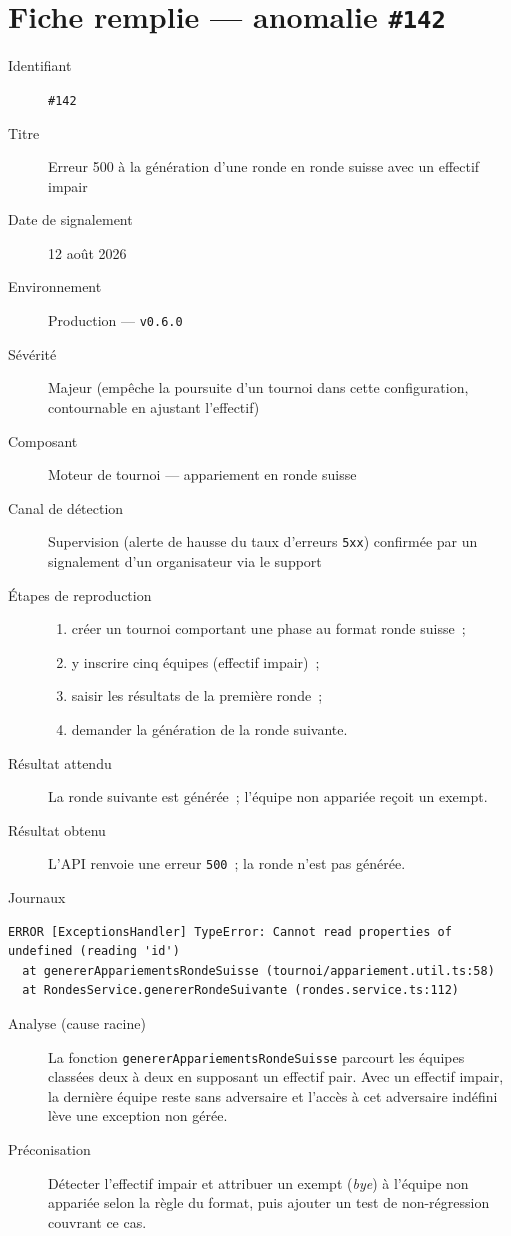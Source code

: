 \section*{Fiche remplie --- anomalie \texttt{\#142}}
\begin{description}
    \item[Identifiant] \texttt{\#142}
    \item[Titre] Erreur 500 à la génération d'une ronde en ronde suisse avec un effectif impair
    \item[Date de signalement] 12 août 2026
    \item[Environnement] Production --- \texttt{v0.6.0}
    \item[Sévérité] Majeur (empêche la poursuite d'un tournoi dans cette configuration, contournable en ajustant l'effectif)
    \item[Composant] Moteur de tournoi --- appariement en ronde suisse
    \item[Canal de détection] Supervision (alerte de hausse du taux d'erreurs \texttt{5xx}) confirmée par un signalement d'un organisateur via le support
    \item[Étapes de reproduction] \hfill
        \begin{enumerate}
            \item créer un tournoi comportant une phase au format ronde suisse~;
            \item y inscrire cinq équipes (effectif impair)~;
            \item saisir les résultats de la première ronde~;
            \item demander la génération de la ronde suivante.
        \end{enumerate}
    \item[Résultat attendu] La ronde suivante est générée~; l'équipe non appariée reçoit un exempt.
    \item[Résultat obtenu] L'API renvoie une erreur \texttt{500}~; la ronde n'est pas générée.
    \item[Journaux] \hfill
\end{description}

\begin{lstlisting}
ERROR [ExceptionsHandler] TypeError: Cannot read properties of
undefined (reading 'id')
  at genererAppariementsRondeSuisse (tournoi/appariement.util.ts:58)
  at RondesService.genererRondeSuivante (rondes.service.ts:112)
\end{lstlisting}

\begin{description}
    \item[Analyse (cause racine)] La fonction \texttt{genererAppariementsRondeSuisse} parcourt les équipes classées deux à deux en supposant un effectif pair. Avec un effectif impair, la dernière équipe reste sans adversaire et l'accès à cet adversaire indéfini lève une exception non gérée.
    \item[Préconisation] Détecter l'effectif impair et attribuer un exempt (\emph{bye}) à l'équipe non appariée selon la règle du format, puis ajouter un test de non-régression couvrant ce cas.
\end{description}

